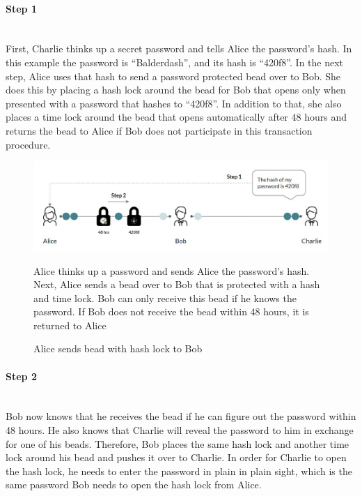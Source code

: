 \documentclass[a4paper, 12pt]{report}
\begin{document}
\paragraph{Step 1} \hspace{0pt} \\
First, Charlie thinks up a secret password and tells Alice the password’s hash. In this example the password is “Balderdash”, and its hash is “420f8”. In the next step, Alice uses that hash to send a password protected bead over to Bob. She does this by placing a hash lock around the bead for Bob that opens only when presented with a password that hashes to “420f8”. In addition to that, she also places a time lock around the bead that opens automatically after 48 hours and returns the bead to Alice if Bob does not participate in this transaction procedure.

\begin{figure}[H]
	\includegraphics[width=\textwidth]{09_HTLC_Step1}
	\caption{Alice sends bead with hash lock to Bob}
	\medskip
	\small Alice thinks up a password and sends Alice the password’s hash. Next, Alice sends a bead over to Bob that is protected with a hash and time lock. Bob can only receive this bead if he knows the password. If Bob does not receive the bead within 48 hours, it is returned to Alice
	\label{fig:09_HTLC_Step1}
\end{figure}

\paragraph{Step 2} \hspace{0pt} \\
Bob now knows that he receives the bead if he can figure out the password within 48 hours. He also knows that Charlie will reveal the password to him in exchange for one of his beads. Therefore, Bob places the same hash lock and another time lock around his bead and pushes it over to Charlie. In order for Charlie to open the hash lock, he needs to enter the password in plain in plain sight, which is the same password Bob needs to open the hash lock from Alice.
\end{document}
